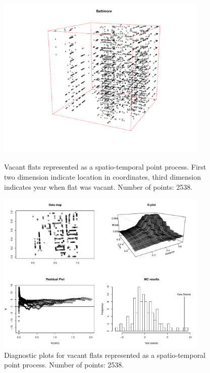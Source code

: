 \documentclass{article}
\begin{document}
\begin{figure}[p]
  \centering
    \includegraphics[width=0.9\textwidth]{PP_balt.pdf}
  \caption{Vacant flats represented as a spatio-temporal point process. First two dimension indicate location in coordinates, third dimension indicates year when flat was vacant. Number of points: 2538. }
  \label{fig:baltPP}

\vspace*{\floatsep}

    \includegraphics[width=0.9\textwidth]{diag_balt.pdf}
  \caption{Diagnostic plots for vacant flats represented as a spatio-temporal point process. Number of points: 2538. } 
  \label{fig:baltDiag}
\end{figure}
\end{document}
